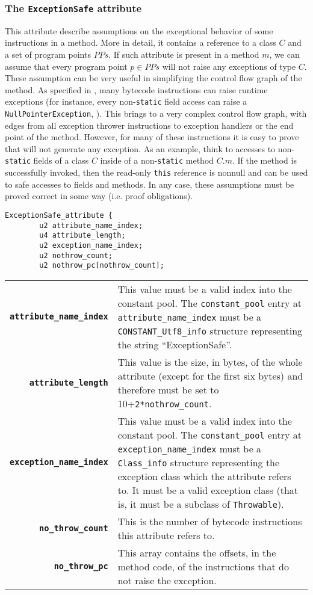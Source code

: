 \documentclass [a4paper,twoside]{article}
\begin{document}
\subsubsection{The \texttt{ExceptionSafe} attribute}\label{sec:es}
This attribute describe assumptions on the exceptional behavior of
some instructions in a method. More in detail, it contains a reference
to a class $C$ and a set of program points $PPs$. If such attribute is
present in a method $m$, we can assume that every program point $p \in
PPs$ will not raise any exceptions of type $C$. These assumption can be
very useful in simplifying the control flow graph of the method. As
specified in \cite[\S 6]{VMSPEC2}, many bytecode instructions can
raise runtime exceptions (for instance, every non-\texttt{static}
field access can raise a \texttt{NullPointerException}, ). This brings
to a very complex control flow graph, with edges from all exception
thrower instructions to exception handlers or the end point of the
method. However, for many of these instructions it is easy to prove
that will not generate any exception. As an example, think to accesses
to non-\texttt{static} fields of a class $C$ inside of a
non-\texttt{static} method $C.m$. If the method is successfully
invoked, then the read-only \texttt{this} reference is nonnull and can
be used to safe accesses to fields and methods. In any case, these
assumptions must be proved correct in some way (i.e. proof
obligations).

\begin{lstlisting}[frame=tb]
ExceptionSafe_attribute {  
        u2 attribute_name_index;
        u4 attribute_length;
        u2 exception_name_index;
        u2 nothrow_count;
        u2 nothrow_pc[nothrow_count];
\end{lstlisting}

\begin{tabular}{rp{220pt}}
\textbf{\texttt{attribute\_name\_index}}& 
This value must be a valid index into the constant pool. The
\verb+constant_pool+ entry at \verb+attribute_name_index+ must be a
\verb+CONSTANT_Utf8_info+ structure representing the string
``ExceptionSafe''. \\
\textbf{\texttt{attribute\_length}}&
This value is the size, in bytes, of the whole attribute (except for
the first six bytes) and therefore must be set to
10+\verb+2*nothrow_count+.\\
\textbf{\texttt{exception\_name\_index}}& 
This value must be a valid index into the constant pool. The
\verb+constant_pool+ entry at \verb+exception_name_index+ must be a
\verb+Class_info+ structure representing the exception class which the 
attribute refers to. It must be a valid exception class (that is, it 
must be a subclass of \texttt{Throwable}).\\
\textbf{\texttt{no\_throw\_count}}&
This is the number of bytecode instructions this attribute refers to.\\ 
\textbf{\texttt{no\_throw\_pc}}&
This array contains the offsets, in the method code, of the instructions
that do not raise the exception.\\
\end{tabular}
\end{document}
